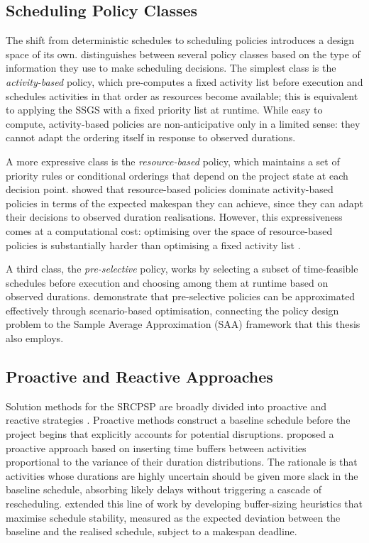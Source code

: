 \subsection*{Scheduling Policy Classes}
The shift from deterministic schedules to scheduling policies introduces a design space
of its own. \cite{Stork2001} distinguishes between several policy classes based on the
type of information they use to make scheduling decisions. The simplest class is the
\textit{activity-based} policy, which pre-computes a fixed activity list before
execution and schedules activities in that order as resources become available; this is
equivalent to applying the SSGS with a fixed priority list at runtime. While easy to
compute, activity-based policies are non-anticipative only in a limited sense: they
cannot adapt the ordering itself in response to observed durations.

A more expressive class is the \textit{resource-based} policy, which maintains a set of
priority rules or conditional orderings that depend on the project state at each
decision point. \cite{Stork2001} showed that resource-based policies dominate
activity-based policies in terms of the expected makespan they can achieve, since they
can adapt their decisions to observed duration realisations. However, this expressiveness
comes at a computational cost: optimising over the space of resource-based policies is
substantially harder than optimising a fixed activity list
\parencite[p.~65 ff.]{Stork2001}.

A third class, the \textit{pre-selective} policy, works by selecting a subset of
time-feasible schedules before execution and choosing among them at runtime based on
observed durations. \cite{Lamas2016} demonstrate that pre-selective policies can be
approximated effectively through scenario-based optimisation, connecting the policy
design problem to the Sample Average Approximation (SAA) framework that this thesis
also employs.

\subsection*{Proactive and Reactive Approaches}
Solution methods for the SRCPSP are broadly divided into proactive and reactive
strategies \parencite{Herroelen2005}. Proactive methods construct a baseline schedule
before the project begins that explicitly accounts for potential disruptions.
\cite{Herroelen2004a} proposed a proactive approach based on inserting time buffers
between activities proportional to the variance of their duration distributions. The
rationale is that activities whose durations are highly uncertain should be given more
slack in the baseline schedule, absorbing likely delays without triggering a cascade of
rescheduling. \cite{VanDeVonder2008} extended this line of work by developing
buffer-sizing heuristics that maximise schedule stability, measured as the expected
deviation between the baseline and the realised schedule, subject to a makespan
deadline.

